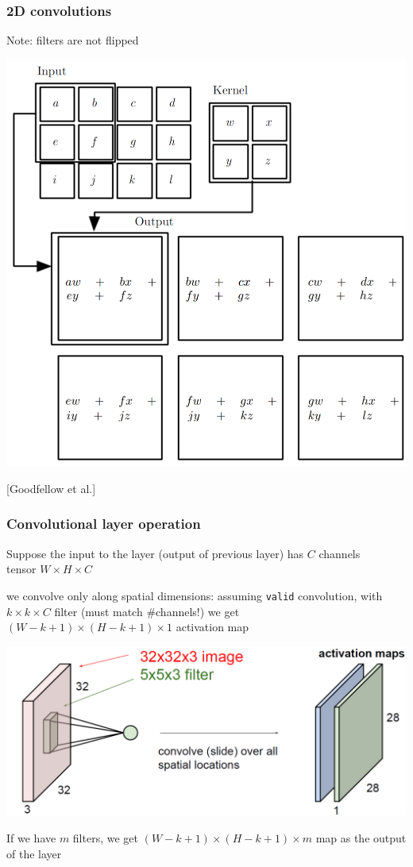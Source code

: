 \documentclass[xcolor=dvipsnames]{beamer}
\begin{document}
\begin{frame}
  \frametitle{2D convolutions}
  \begin{minipage}[c]{.25\linewidth}
    \bi
\item Note: filters are not flipped
\ei
  \end{minipage}%
  \begin{minipage}[c]{.75\linewidth}
\includegraphics[width=.9\textwidth]{gcb-conv2dexample}

[Goodfellow et al.]    
  \end{minipage}


\end{frame}


\begin{frame}
  \frametitle{Convolutional layer operation}
  \bi
\item Suppose the input to the layer (output of previous layer) has
  $C$ channels\\
tensor $W\times H\times C$
\item we convolve only along spatial dimensions: assuming {\tt valid}
  convolution, with $k\times k\times C$ filter (must match
  \#channels!) we get $(W-k+1)\times(H-k+1)\times 1$ activation map

\includegraphics[width=.7\textwidth]{ak-conv-2maps-ill}
\raisebox{2em}{[A. Karpathy]}
\item If we have $m$ filters, we get $(W-k+1)\times(H-k+1)\times m$
  map as the output of the layer
\ei
\end{frame}
\end{document}
